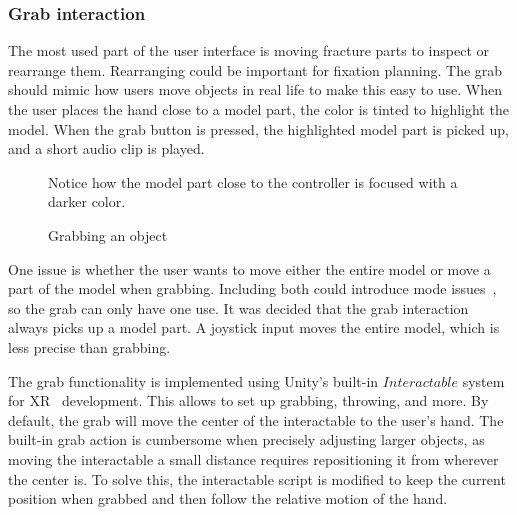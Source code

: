 \documentclass[a4paper]{report}
\begin{document}
\subsubsection{Grab interaction}

The most used part of the user interface is moving fracture parts to inspect or rearrange them. Rearranging could be important for fixation planning.
The grab should mimic how users move objects in real life to make this easy to use. When the user places the hand close to a model part, the color is tinted to highlight the model. When the grab button is pressed, the highlighted model part is picked up, and a short audio clip is played.

\begin{figure}[h!]
    \centering
	\hfill
  \caption{Grabbing an object}\label{grabbing}
  \small
  Notice how the model part close to the controller is focused with a darker color.
\end{figure}

One issue is whether the user wants to move either the entire model or move a part of the model when grabbing. Including both could introduce mode issues~\cite{experience_modes_nodate}, so the grab can only have one use.
It was decided that the grab interaction always picks up a model part. A joystick input moves the entire model, which is less precise than grabbing.

The grab functionality is implemented using Unity's built-in $Interactable$ system for XR~\cite{noauthor_xr_nodate} development. This allows to set up grabbing, throwing, and more. 
By default, the grab will move the center of the interactable to the user's hand. The built-in grab action is cumbersome when precisely adjusting larger objects, as moving the interactable a small distance requires repositioning it from wherever the center is. 
To solve this, the interactable script is modified to keep the current position when grabbed and then follow the relative motion of the hand.
\end{document}
